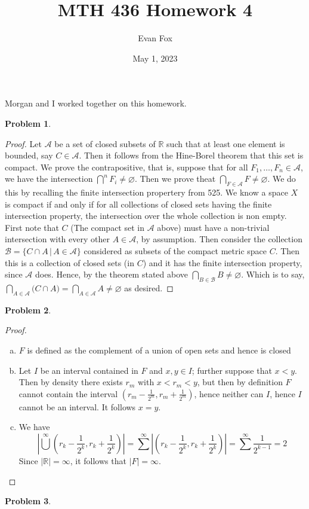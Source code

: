\documentclass{article}
\title{MTH 436 Homework 4}
\author{Evan Fox}
\date{May 1, 2023}
\newcommand{\R}{\mathbb{R}}
\newtheorem{prb}{Problem}
\begin{document}
\maketitle
Morgan and I worked together on this homework. 
	\begin{prb}
		
	\end{prb} 

\begin{proof}
	Let $ \mathcal{A}$ be a set of closed subsets of $\R$ such that at least one element is bounded, say $C \in \mathcal{A}$. Then it follows 
	from the Hine-Borel theorem that this set is compact. 
	We prove the contrapositive, that is, suppose that for all $F_1, \dots , F_n \in \mathcal{A}$, we have the intersection 
	$\bigcap^n F_i \neq \varnothing $. Then we prove theat $\bigcap_{F \in \mathcal{A}} F \neq \varnothing$. 
	We do this by recalling the finite intersection propertery from 525. We know a space $X$ is compact if and only if for all collections 
	of closed sets having the finite intersection property, the intersection over the whole collection is non empty. 
	First note that $C$ (The compact set in $\mathcal{A}$ above) must have a non-trivial intersection with every other $A \in \mathcal{A}$, by assumption. 	Then consider the collection $\mathcal{B} = \{C \cap A \, | \, A \in \mathcal{A}\}$ considered as subsets of the compact metric space $C$. Then 
	this is a collection of closed sets (in $C$) and it has the finite intersection property, since $\mathcal{A}$ does. 
	Hence, by the theorem stated above $\bigcap_{B \in \mathcal{B}} B \neq \varnothing$. Which is to say, 
	$\bigcap_{A \in \mathcal{A}} \Big(C \cap A \Big) = \bigcap_{A \in \mathcal{A}} A \neq \varnothing$ as desired.  
	\end{proof}

\begin{prb}
		
\end{prb}
\begin{proof}
	\begin{enumerate}[(a)]
		\item $F$ is defined as the complement of a union of open sets and hence is closed 
			\item Let $I$ be an interval contained in $F$ and $x, y \in I$; further suppose that  $x < y$.  
				Then by density there exists $r_m$ with $x < r_m < y$, but then by definition $F$ cannot contain the interval 
				$(r_m - \frac{1}{2^m}, r_m + \frac{1}{2^m})$, hence neither can $I$, hence $I$ cannot be an interval. It follows $x = y$. 
			\item We have 
				\[
| \bigcup^\infty (r_k - \frac{1}{2^k}, r_k + \frac{1}{2^k} ) | = \sum^\infty |(r_k - \frac{1}{2^k}, r_k + \frac{1}{2^k} )|  = \sum^\infty \frac{1}{2^{k-1}} 
= 2 
				\]
				Since $|\R| = \infty$, it follows that $|F| = \infty$. 
	\end{enumerate}
\end{proof}
\begin{prb}
	
\end{prb}
\end{document}
